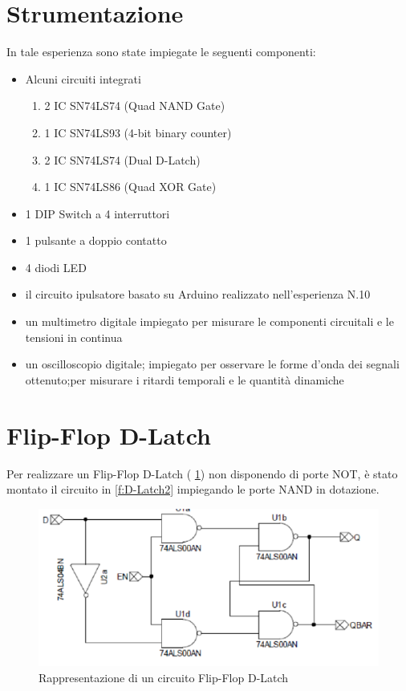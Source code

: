 \section{Strumentazione}
	In tale esperienza sono state impiegate le seguenti componenti:\begin{itemize}
		\item Alcuni circuiti integrati \begin{enumerate}
			\item 2 IC SN74LS74 (Quad NAND Gate)
			\item 1 IC SN74LS93 (4-bit binary counter)
			\item 2 IC SN74LS74 (Dual D-Latch)
			\item 1 IC SN74LS86 (Quad XOR Gate)
		\end{enumerate}
		\item 1 DIP Switch a 4 interruttori
		\item 1 pulsante a doppio contatto
		\item 4 diodi LED
		\item il circuito ipulsatore basato su Arduino realizzato nell'esperienza N.10
		\item un multimetro digitale impiegato per misurare le componenti circuitali e le tensioni in continua
		\item un oscilloscopio digitale; impiegato per osservare le forme d'onda dei segnali ottenuto;per misurare i ritardi temporali e le quantità dinamiche
	\end{itemize}
\section{Flip-Flop D-Latch}
	Per realizzare un Flip-Flop D-Latch (\figurename{ \ref{f:D-Latch1}}) non disponendo di porte NOT, è stato montato il circuito in \figurename{ \ref{f:D-Latch2}} impiegando le
	porte NAND in dotazione.
	\begin{figure}[hb]
		\centering
		\includegraphics[scale=0.75]{../Figs-Tabs/D-Latch1.png}
		\caption{Rappresentazione di un circuito Flip-Flop D-Latch}
			\label{f:D-Latch1}
	\end{figure}

